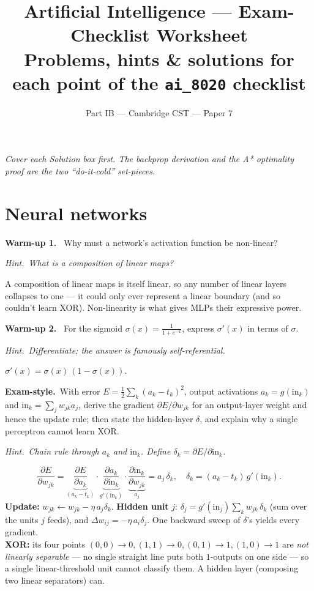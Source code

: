 \documentclass[11pt,a4paper]{article}
\title{\vspace{-1.5cm}\textbf{Artificial Intelligence --- Exam-Checklist Worksheet}\\[2pt]
\large Problems, hints \& solutions for each point of the \texttt{ai\_8020} checklist}
\author{\small Part IB --- Cambridge CST --- Paper 7}
\date{}
\newcommand{\hint}[1]{\par{\small\textcolor{accent}{\textit{Hint.}}\ \textit{#1}}\par\smallskip}
\newcommand{\warm}[1]{\smallskip\textbf{\textcolor{hi}{Warm-up #1.}}\ }
\newcommand{\exam}{\smallskip\textbf{\textcolor{warn}{Exam-style.}}\ }
\begin{document}
\maketitle
\vspace{-0.8cm}
\textit{Cover each Solution box first. The backprop derivation and the A* optimality proof are the two ``do-it-cold'' set-pieces.}

\hrulefill

\section{Neural networks}

\warm{1} Why must a network's activation function be non-linear?
\hint{What is a composition of linear maps?}
\begin{sol}A composition of linear maps is itself linear, so any number of linear layers collapses to one --- it could only ever represent a linear boundary (and so couldn't learn XOR). Non-linearity is what gives MLPs their expressive power.\end{sol}

\warm{2} For the sigmoid $\sigma(x)=\tfrac1{1+e^{-x}}$, express $\sigma'(x)$ in terms of $\sigma$.
\hint{Differentiate; the answer is famously self-referential.}
\begin{sol}$\sigma'(x)=\sigma(x)\,(1-\sigma(x))$.\end{sol}

\exam With error $E=\tfrac12\sum_k (a_k-t_k)^2$, output activations $a_k=g(\mathrm{in}_k)$ and $\mathrm{in}_k=\sum_j w_{jk}a_j$, derive the gradient $\partial E/\partial w_{jk}$ for an output-layer weight and hence the update rule; then state the hidden-layer $\delta$, and explain why a single perceptron cannot learn XOR.
\hint{Chain rule through $a_k$ and $\mathrm{in}_k$. Define $\delta_k=\partial E/\partial \mathrm{in}_k$.}
\begin{sol}
\[
\frac{\partial E}{\partial w_{jk}}=\underbrace{\frac{\partial E}{\partial a_k}}_{(a_k-t_k)}\cdot\underbrace{\frac{\partial a_k}{\partial \mathrm{in}_k}}_{g'(\mathrm{in}_k)}\cdot\underbrace{\frac{\partial \mathrm{in}_k}{\partial w_{jk}}}_{a_j}=a_j\,\delta_k,\quad \delta_k=(a_k-t_k)\,g'(\mathrm{in}_k).
\]
\textbf{Update:} $w_{jk}\leftarrow w_{jk}-\eta\,a_j\delta_k$. \textbf{Hidden unit} $j$: $\delta_j=g'(\mathrm{in}_j)\sum_k w_{jk}\,\delta_k$ (sum over the units $j$ feeds), and $\Delta w_{ij}=-\eta\,a_i\delta_j$. One backward sweep of $\delta$'s yields every gradient.\\[3pt]
\textbf{XOR:} its four points $(0,0)\!\to\!0,(1,1)\!\to\!0,(0,1)\!\to\!1,(1,0)\!\to\!1$ are \emph{not linearly separable} --- no single straight line puts both $1$-outputs on one side --- so a single linear-threshold unit cannot classify them. A hidden layer (composing two linear separators) can.
\end{sol}
\end{document}
